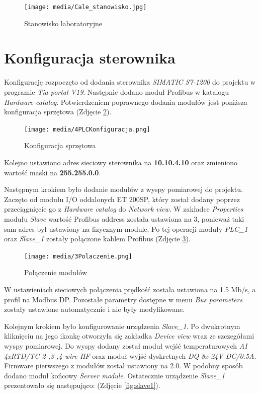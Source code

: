\documentclass{article}
\begin{document}
\begin{figure}[H]
    \centering
    \texttt{[image: media/Cale\_stanowisko.jpg]}
    \caption{Stanowisko laboratoryjne}
    \label{fig:stanowisko}
\end{figure}
\newpage
\section{Konfiguracja sterownika}

Konfigurację rozpoczęto od dodania sterownika \textit{SIMATIC S7-1200} do projektu w programie \textit{Tia portal V19}. Następnie dodano moduł Profibus w katalogu \textit{Hardware catalog}. Potwierdzeniem poprawnego dodania modułów jest poniższa konfiguracja sprzętowa (Zdjęcie \ref{fig:konfiguracja}).

\begin{figure}[H]
    \centering
    \texttt{[image: media/4PLCKonfiguracja.png]}
    \caption{Konfiguracja sprzętowa}
    \label{fig:konfiguracja}
\end{figure}

Kolejno ustawiono adres sieciowy sterownika na \textbf{10.10.4.10} oraz zmieniono wartość maski na \textbf{255.255.0.0}.

Następnym krokiem było dodanie modułów z wyspy pomiarowej do projektu. Zaczęto od modułu I/O oddalonych ET 200SP, który został dodany poprzez przeciągnięcie go z \textit{Hardware catalog} do \textit{Network view}. W zakładce \textit{Properties} modułu \textit{Slave} wartość Profibus address została ustawiona na 3, ponieważ taki sam adres był ustawiony na fizycznym module. Po tej operacji moduły \textit{PLC\_1} oraz \textit{Slave\_1} zostały połączone kablem Profibus (Zdjęcie \ref{fig:polaczenie}). 

\begin{figure}[H]
    \centering
    \texttt{[image: media/3Polaczenie.png]}
    \caption{Połączenie modułów}
    \label{fig:polaczenie}
\end{figure}

W ustawieniach sieciowych połączenia prędkość została ustawiona na 1.5 Mb/s, a profil na Modbus DP. Pozostałe parametry dostępne w menu \textit{Bus parameters} zostały ustawione automatycznie i nie były modyfikowane.

Kolejnym krokiem było konfigurowanie urządzenia \textit{Slave\_1}. Po dwukrotnym kliknięciu na jego ikonkę otworzyła się zakładka \textit{Device view} wraz ze szczegółami wyspy pomiarowej. Do wyspy dodany został moduł wejść temperaturowych \textit{AI 4xRTD/TC 2-,3-,4-wire HF} oraz moduł wyjść dyskretnych \textit{DQ 8x 24V DC/0.5A}. Firmware pierwszego z modułów został ustawiony na 2.0. W podobny sposób dodano moduł końcowy \textit{Server module}. Ostatecznie urządzenie \textit{Slave\_1} prezentowało się następująco: (Zdjęcie \ref{fig:slave1}).
\end{document}
